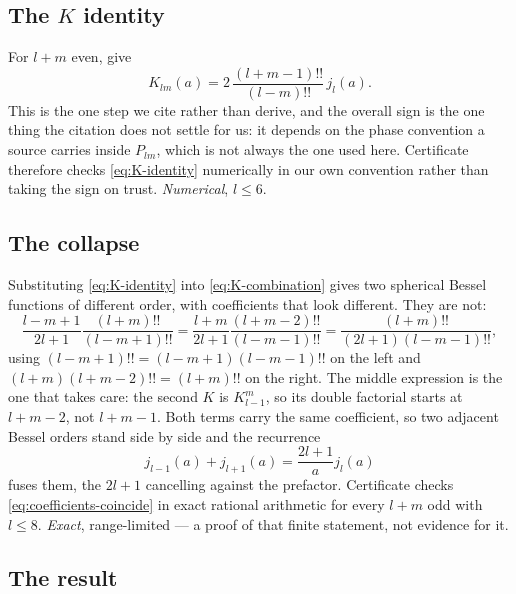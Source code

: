 \subsection{The \texorpdfstring{$K$}{K} identity}
\label{sec:k-identity}

For $l+m$ even, \citet{neves2006} give
\begin{equation}
  K_{lm}(a) = 2 \, \frac{(l+m-1)!!}{(l-m)!!} \, j_l(a) .
  \label{eq:K-identity}
\end{equation}
This is the one step we cite rather than derive, and the overall sign is the one thing the
citation does not settle for us: it depends on the phase convention a source carries inside
$P_{lm}$, which is not always the one used here.  Certificate  therefore checks
\eqref{eq:K-identity} numerically in our own convention rather than taking the sign on
trust.  \emph{Numerical}, $l \le 6$.

\subsection{The collapse}
\label{sec:odd-collapse}

Substituting \eqref{eq:K-identity} into \eqref{eq:K-combination} gives two spherical
Bessel functions of different order, with coefficients that look different.  They
are not:
\begin{equation}
  \frac{l-m+1}{2l+1}\frac{(l+m)!!}{(l-m+1)!!}
  = \frac{l+m}{2l+1}\frac{(l+m-2)!!}{(l-m-1)!!}
  = \frac{(l+m)!!}{(2l+1)(l-m-1)!!} ,
  \label{eq:coefficients-coincide}
\end{equation}
using $(l-m+1)!! = (l-m+1)(l-m-1)!!$ on the left and
$(l+m)(l+m-2)!! = (l+m)!!$ on the right.  The middle expression is the one that
takes care: the second $K$ is $K_{l-1}^m$, so its double factorial starts at
$l+m-2$, not $l+m-1$.  Both terms
carry the same coefficient, so two adjacent Bessel orders stand side by side and the
recurrence \citep[10.51.1]{dlmf}
\begin{equation}
  j_{l-1}(a) + j_{l+1}(a) = \frac{2l+1}{a} j_l(a)
  \label{eq:bessel-recurrence}
\end{equation}
fuses them, the $2l+1$ cancelling against the prefactor.  Certificate 
checks \eqref{eq:coefficients-coincide} in exact rational arithmetic for every
$l+m$ odd with $l \le 8$.  \emph{Exact}, range-limited --- a proof of that finite
statement, not evidence for it.

\subsection{The result}
\label{sec:odd-result}

